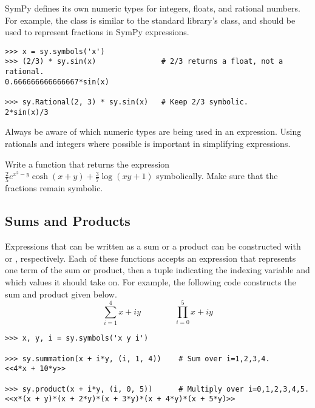 \begin{info}
SymPy defines its own numeric types for integers, floats, and rational numbers.
For example, the  class is similar to the standard library's  class, and should be used to represent fractions in SymPy expressions.

\begin{lstlisting}
>>> x = sy.symbols('x')
>>> (2/3) * sy.sin(x)               # 2/3 returns a float, not a rational.
0.666666666666667*sin(x)

>>> sy.Rational(2, 3) * sy.sin(x)   # Keep 2/3 symbolic.
2*sin(x)/3
\end{lstlisting}
Always be aware of which numeric types are being used in an expression.
Using rationals and integers where possible is important in simplifying expressions.
\end{info}

\begin{problem} %
Write a function that returns the expression $\frac{2}{5} e^{x^2-y}\cosh(x+y) + \frac{3}{7}\log(xy+1)$ symbolically.
Make sure that the fractions remain symbolic.
\end{problem}

\subsection*{Sums and Products} %

Expressions that can be written as a sum or a product can be constructed with  or , respectively.
Each of these functions accepts an expression that represents one term of the sum or product, then a tuple indicating the indexing variable and which values it should take on.
For example, the following code constructs the sum and product given below.
\[
\sum_{i=1}^{4} x + iy
\qquad\qquad
\prod_{i=0}^{5} x + iy
\]

\begin{lstlisting}
>>> x, y, i = sy.symbols('x y i')

>>> sy.summation(x + i*y, (i, 1, 4))    # Sum over i=1,2,3,4.
<<4*x + 10*y>>

>>> sy.product(x + i*y, (i, 0, 5))      # Multiply over i=0,1,2,3,4,5.
<<x*(x + y)*(x + 2*y)*(x + 3*y)*(x + 4*y)*(x + 5*y)>>
\end{lstlisting}

